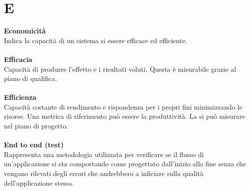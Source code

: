 \section{E}
\textbf{Economicità}\\
Indica la capacità di un sistema si essere efficace ed efficiente.\\ \\
\textbf{Efficacia}\\
Capacità di produrre l'effetto e i risultati voluti. Questa è misurabile grazie al piano di qualifica. \\ \\
\textbf{Efficienza}\\
Capacità costante di rendimento e rispondenza per i propri fini minimizzando le risorse. Una metrica di riferimento può essere la  produttività. La si può misurare nel piano di progetto. \\ \\
\textbf{End to end (test)}\\
Rappresenta una metodologia utilizzata per verificare se il flusso di un'applicazione si sta comportando come progettato dall'inizio alla fine senza che vengano rilevati degli errori che andrebbero a inficiare sulla qualità dell’applicazione stessa. \\ \\
\clearpage